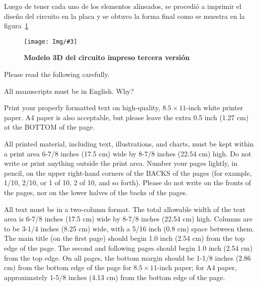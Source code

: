 \documentclass[times, 10pt,twocolumn]{article}
\newcommand{\Img}[5]{
   \begin{figure}[H]
   	   \centering
       \texttt{[image: Img/\#3]}
       \caption{ \centering \textbf{\small #4}}
       \label{#5}
       \end{figure}
   }
\begin{document}
Luego de tener cada uno de los elementos alineados, se procedió a imprimir el diseño del circuito en la placa y se obtuvo la forma final como se muestra en la figura~\ref{fig:11}
\Img{7.9cm}{7.0cm}{tercera_version_3d}{Modelo 3D del circuito impreso tercera versión}{fig:11}


Please read the following carefully.


All manuscripts must be in English. Why?


Print your properly formatted text on high-quality, $8.5 \times 11$-inch 
white printer paper. A4 paper is also acceptable, but please leave the 
extra 0.5 inch (1.27 cm) at the BOTTOM of the page.


All printed material, including text, illustrations, and charts, must be 
kept within a print area 6-7/8 inches (17.5 cm) wide by 8-7/8 inches 
(22.54 cm) high. Do not write or print anything outside the print area. 
Number your pages lightly, in pencil, on the upper right-hand corners of 
the BACKS of the pages (for example, 1/10, 2/10, or 1 of 10, 2 of 10, and 
so forth). Please do not write on the fronts of the pages, nor on the 
lower halves of the backs of the pages.



All text must be in a two-column format. The total allowable width of 
the text area is 6-7/8 inches (17.5 cm) wide by 8-7/8 inches (22.54 cm) 
high. Columns are to be 3-1/4 inches (8.25 cm) wide, with a 5/16 inch 
(0.8 cm) space between them. The main title (on the first page) should 
begin 1.0 inch (2.54 cm) from the top edge of the page. The second and 
following pages should begin 1.0 inch (2.54 cm) from the top edge. On 
all pages, the bottom margin should be 1-1/8 inches (2.86 cm) from the 
bottom edge of the page for $8.5 \times 11$-inch paper; for A4 paper, 
approximately 1-5/8 inches (4.13 cm) from the bottom edge of the page.
\end{document}
